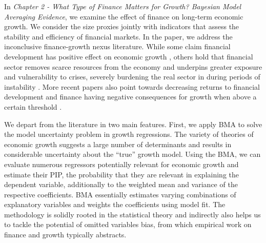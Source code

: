 \begin{refsection}
In \emph{Chapter 2 - What Type of Finance Matters for Growth? Bayesian Model Averaging Evidence}, we examine the effect of finance on long-term economic growth. We consider the size proxies jointly with indicators that assess the stability and efficiency of financial markets. In the paper, we address the inconclusive finance-growth nexus literature. While some claim financial development has positive effect on economic growth \parencite{AtjeJovanovich1993,KingLevine1993a,RajanZingales1998}, others hold that financial sector removes scarce resources from the economy \parencite{bolton2016cream,Tobin1984,axelson2015wall} and underpins greater exposure and vulnerability to crises, severely burdening the real sector in during periods of instability \parencite{Minsky1991,Stiglitz2000}. More recent papers also point towards decreasing returns to financial development and finance having negative consequences for growth when above a certain threshold \parencite{Arcandetal2012,LawSingh2014,RousseauWachtel2011}. 

We depart from the literature in two main features. First, we apply \ac{BMA} to solve the model uncertainty problem in growth regressions. The variety of theories of economic growth suggests a large number of determinants and results in considerable uncertainty about the ``true'' growth model. Using the \ac{BMA}, we can evaluate numerous regressors potentially relevant for economic growth and estimate their \ac{PIP}, the probability that they are relevant in explaining the dependent variable, additionally to the weighted mean and variance of the respective coefficients. \ac{BMA} essentially estimates varying combinations of explanatory variables and weights the coefficients using model fit. The methodology is solidly rooted in the statistical theory \parencite{Rafteryetal1997,Koopetal2007} and indirectly also helps us to tackle the potential of omitted variables bias, from which empirical work on finance and growth typically abstracts.


\end{refsection}
